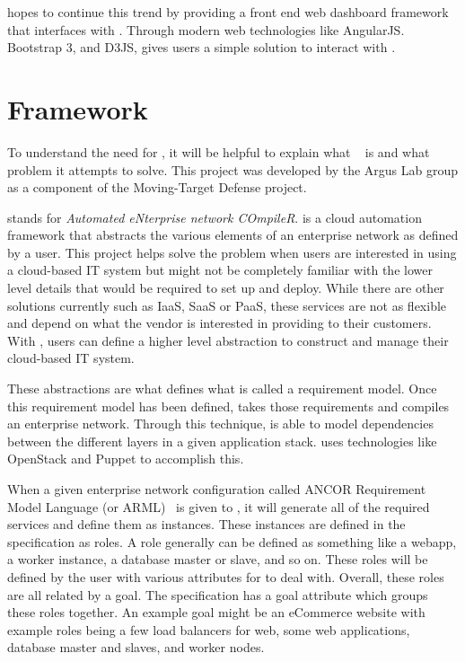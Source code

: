 \projectName{} hopes to continue this trend by providing a front end web dashboard framework that interfaces with \ancor{}. Through modern web technologies like AngularJS. Bootstrap 3, and D3JS, \projectName{} gives users a simple solution to interact with \ancor{}.

\section{\ancor{} Framework}
\label{makereference1.1}

To understand the need for \projectName{}, it will be helpful to explain what \ancor{} ~\cite{DMatrix:Unruh:2014} is and what problem it attempts to solve. This project was developed by the Argus Lab group \cite{Note:ArgusLab:2014} as a component of the Moving-Target Defense project.

\ancor{} stands for \emph{Automated eNterprise network COmpileR}. \ancor{} is a cloud automation framework that abstracts the various elements of an enterprise network as defined by a user. This project helps solve the problem when users are interested in using a cloud-based IT system but might not be completely familiar with the lower level details that would be required to set up and deploy. While there are other solutions currently such as IaaS, SaaS or PaaS, these services are not as flexible and depend on what the vendor is interested in providing to their customers. With \ancor{}, users can define a higher level abstraction to construct and manage their cloud-based IT system.

These abstractions are what defines what is called a requirement model. Once this requirement model has been defined, \ancor{} takes those requirements and compiles an enterprise network. Through this technique, \ancor{} is able to model dependencies between the different layers in a given application stack. \ancor{} uses technologies like OpenStack and Puppet to accomplish this.

When a given enterprise network configuration called ANCOR Requirement Model Language (or ARML)~\cite{DMatrix:Unruh:2014} is given to \ancor{}, it will generate all of the required services and define them as instances. These instances are defined in the specification as roles. A role generally can be defined as something like a webapp, a worker instance, a database master or slave, and so on. These roles will be defined by the user with various attributes for \ancor{} to deal with. Overall, these roles are all related by a goal. The specification has a goal attribute which groups these roles together. An example goal might be an eCommerce website with example roles being a few load balancers for web, some web applications, database master and slaves, and worker nodes.

